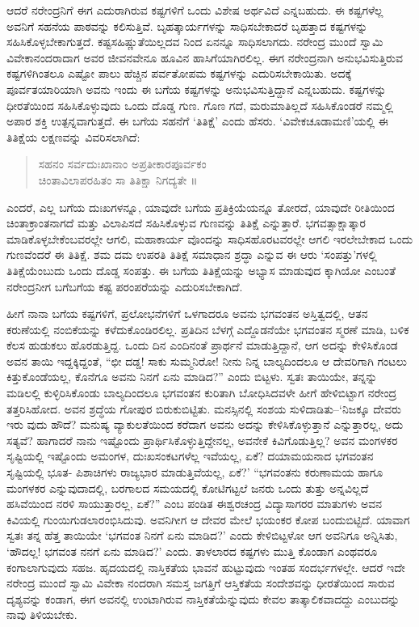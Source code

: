 ಆದರೆ ನರೇಂದ್ರನಿಗೆ ಈಗ ಎದುರಾಗಿರುವ ಕಷ್ಟಗಳಿಗೆ ಒಂದು ವಿಶೇಷ ಅರ್ಥವಿದೆ ಎನ್ನಬಹುದು. ಈ ಕಷ್ಟಗಳೆಲ್ಲ ಅವನಿಗೆ ಸಹನೆಯ ಪಾಠವನ್ನು ಕಲಿಸುತ್ತಿವೆ. ಬೃಹತ್ಕಾರ್ಯಗಳನ್ನು ಸಾಧಿಸಬೇಕಾದರೆ ಬೃಹತ್ತಾದ ಕಷ್ಟಗಳನ್ನು ಸಹಿಸಿಕೊಳ್ಳಬೇಕಾಗುತ್ತದೆ. ಕಷ್ಟಸಹಿಷ್ಣುತೆಯಿಲ್ಲದವ ನಿಂದ ಏನನ್ನೂ ಸಾಧಿಸಲಾಗದು. ನರೇಂದ್ರ ಮುಂದೆ ಸ್ವಾಮಿ ವಿವೇಕಾನಂದರಾದಾಗ ಅವರ ಜೀವನವೇನೂ ಹೂವಿನ ಹಾಸಿಗೆಯಾಗಿರಲಿಲ್ಲ. ಈಗ ನರೇಂದ್ರನಾಗಿ ಅನುಭವಿಸುತ್ತಿರುವ ಕಷ್ಟಗಳಿಗಿಂತಲೂ ಎಷ್ಟೋ ಪಾಲು ಹೆಚ್ಚಿನ ಪರ್ವತೋಪಮ ಕಷ್ಟಗಳನ್ನು ಎದುರಿಸಬೇಕಾಯಿತು. ಅದಕ್ಕೆ ಪೂರ್ವತಯಾರಿಯಾಗಿ ಅವನು ಇಂದು ಈ ಬಗೆಯ ಕಷ್ಟಗಳನ್ನು ಅನುಭವಿಸುತ್ತಿದ್ದಾನೆ ಎನ್ನಬಹುದು. ಕಷ್ಟಗಳನ್ನು ಧೀರತೆಯಿಂದ ಸಹಿಸಿಕೊಳ್ಳುವುದು ಒಂದು ದೊಡ್ಡ ಗುಣ. ಗೊಣ ಗದೆ, ಮರುಮಾತಿಲ್ಲದೆ ಸಹಿಸಿಕೊಂಡರೆ ನಮ್ಮಲ್ಲಿ ಅಪಾರ ಶಕ್ತಿ ಉತ್ಪನ್ನವಾಗುತ್ತದೆ. ಈ ಬಗೆಯ ಸಹನೆಗೆ ‘ತಿತಿಕ್ಷೆ’ ಎಂದು ಹೆಸರು. ‘ವಿವೇಕಚೂಡಾಮಣಿ’ಯಲ್ಲಿ ಈ ತಿತಿಕ್ಷೆಯ ಲಕ್ಷಣವನ್ನು ವಿವರಿಸಲಾಗಿದೆ:

\begin{verse}
ಸಹನಂ ಸರ್ವದುಃಖಾನಾಂ ಅಪ್ರತೀಕಾರಪೂರ್ವಕಂ\\ಚಿಂತಾವಿಲಾಪರಹಿತಂ ಸಾ ತಿತಿಕ್ಷಾ ನಿಗದ್ಯತೇ ॥
\end{verse}

\noindent

ಎಂದರೆ, ಎಲ್ಲ ಬಗೆಯ ದುಃಖಗಳನ್ನೂ, ಯಾವುದೇ ಬಗೆಯ ಪ್ರತಿಕ್ರಿಯೆಯನ್ನೂ ತೋರದೆ, ಯಾವುದೇ ರೀತಿಯಿಂದ ಚಿಂತಾಕ್ರಾಂತನಾಗದೆ ಮತ್ತು ವಿಲಾಪಿಸದೆ ಸಹಿಸಿಕೊಳ್ಳುವ ಗುಣವನ್ನು ತಿತಿಕ್ಷೆ ಎನ್ನುತ್ತಾರೆ. ಭಗವತ್ಸಾಕ್ಷಾತ್ಕಾರ ಮಾಡಿಕೊಳ್ಳಬೇಕೆಂಬವರಲ್ಲೇ ಆಗಲಿ, ಮಹಾಕಾರ್ಯ ವೊಂದನ್ನು ಸಾಧಿಸಹೊರಟವರಲ್ಲೇ ಆಗಲಿ ಇರಲೇಬೇಕಾದ ಒಂದು ಗುಣವೆಂದರೆ ಈ ತಿತಿಕ್ಷೆ. ಶಮ ದಮ ಉಪರತಿ ತಿತಿಕ್ಷೆ ಸಮಾಧಾನ ಶ್ರದ್ಧಾ ಎನ್ನುವ ಈ ಆರು ‘ಸಂಪತ್ತು’ಗಳಲ್ಲಿ ತಿತಿಕ್ಷೆಯೆಂಬುದು ಒಂದು ದೊಡ್ಡ ಸಂಪತ್ತು. ಈ ಬಗೆಯ ತಿತಿಕ್ಷೆಯನ್ನು ಅಭ್ಯಾಸ ಮಾಡುವುದ ಕ್ಕಾಗಿಯೋ ಎಂಬಂತೆ ನರೇಂದ್ರನೀಗ ಬಗೆಬಗೆಯ ಕಷ್ಟ ಪರಂಪರೆಯನ್ನು ಎದುರಿಸಬೇಕಾಗಿದೆ.

ಹೀಗೆ ನಾನಾ ಬಗೆಯ ಕಷ್ಟಗಳಿಗೆ, ಪ್ರಲೋಭನೆಗಳಿಗೆ ಒಳಗಾದರೂ ಅವನು ಭಗವಂತನ ಅಸ್ತಿತ್ವದಲ್ಲಿ, ಆತನ ಕರುಣೆಯಲ್ಲಿ ನಂಬಿಕೆಯನ್ನು ಕಳೆದುಕೊಂಡಿರಲಿಲ್ಲ. ಪ್ರತಿದಿನ ಬೆಳಗ್ಗೆ ಎದ್ದೊಡನೆಯೇ ಭಗವಂತನ ಸ್ಮರಣೆ ಮಾಡಿ, ಬಳಿಕ ಕೆಲಸ ಹುಡುಕಲು ಹೊರಡುತ್ತಿದ್ದ. ಒಂದು ದಿನ ಎಂದಿನಂತೆ ಪ್ರಾರ್ಥನೆ ಮಾಡುತ್ತಿದ್ದಾನೆ, ಆಗ ಅದನ್ನು ಕೇಳಿಸಿಕೊಂಡ ಅವನ ತಾಯಿ ಇದ್ದಕ್ಕಿದ್ದಂತೆ, “ಛೀ ದಡ್ಡ! ಸಾಕು ಸುಮ್ಮನಿರೋ! ನೀನು ನಿನ್ನ ಬಾಲ್ಯದಿಂದಲೂ ಆ ದೇವರಿಗಾಗಿ ಗಂಟಲು ಕಿತ್ತುಕೊಂಡೆಯಲ್ಲ, ಕೊನೆಗೂ ಅವನು ನಿನಗೆ ಏನು ಮಾಡಿದ?” ಎಂದು ಬಿಟ್ಟಳು. ಸ್ವತಃ ತಾಯಿಯೇ, ತನ್ನನ್ನು ಮಡಿಲಲ್ಲಿ ಕುಳ್ಳಿರಿಸಿಕೊಂಡು ಬಾಲ್ಯದಿಂದಲೂ ಭಗವಂತನ ಕುರಿತಾಗಿ ಬೋಧಿಸಿದವಳೇ ಹೀಗೆ ಹೇಳಿಬಿಟ್ಟಾಗ ನರೇಂದ್ರ ತತ್ತರಿಸಿಹೋದ. ಅವನ ಶ್ರದ್ಧೆಯ ಗೋಪುರ ಬಿರುಕುಬಿಟ್ಟಿತು. ಮನಸ್ಸಿನಲ್ಲಿ ಸಂಶಯ ಸುಳಿದಾಡಿತು–‘ನಿಜಕ್ಕೂ ದೇವರು ಇರು ವುದು ಹೌದೆ? ಮನುಷ್ಯ ವ್ಯಾಕುಲತೆಯಿಂದ ಕರೆದಾಗ ಅವನು ಅದನ್ನು ಕೇಳಿಸಿಕೊಳ್ಳುತ್ತಾನೆ ಎನ್ನುತ್ತಾರಲ್ಲ, ಅದು ಸತ್ಯವೆ? ಹಾಗಾದರೆ ನಾನು ಇಷ್ಟೊಂದು ಪ್ರಾರ್ಥಿಸಿಕೊಳ್ಳುತ್ತಿದ್ದೇನಲ್ಲ, ಅವನೇಕೆ ಕಿವಿಗೊಡುತ್ತಿಲ್ಲ? ಅವನ ಮಂಗಳಕರ ಸೃಷ್ಟಿಯಲ್ಲಿ ಇಷ್ಟೊಂದು ಅಮಂಗಳ, ದುಃಖಸಂಕಟಗಳೆಲ್ಲ ಇವೆಯಲ್ಲ, ಏಕೆ? ದಯಾಮಯನಾದ ಭಗವಂತನ ಸೃಷ್ಟಿಯಲ್ಲಿ ಭೂತ- ಪಿಶಾಚಿಗಳು ರಾಜ್ಯಭಾರ ಮಾಡುತ್ತಿವೆಯಲ್ಲ, ಏಕೆ?’ “ಭಗವಂತನು ಕರುಣಾಮಯ ಹಾಗೂ ಮಂಗಳಕರ ಎನ್ನುವುದಾದಲ್ಲಿ, ಬರಗಾಲದ ಸಮಯದಲ್ಲಿ ಕೋಟಿಗಟ್ಟಲೆ ಜನರು ಒಂದು ತುತ್ತು ಅನ್ನವಿಲ್ಲದೆ ಹಸಿವೆಯಿಂದ ನರಳಿ ಸಾಯುತ್ತಾರಲ್ಲ, ಏಕೆ?” ಎಂಬ ಪಂಡಿತ ಈಶ್ವರಚಂದ್ರ ವಿದ್ಯಾಸಾಗರರ ಮಾತುಗಳು ಅವನ ಕಿವಿಯಲ್ಲಿ ಗುಂಯಿಗುಡಲಾರಂಭಿಸಿದುವು. ಅವನಿಗೀಗ ಆ ದೇವರ ಮೇಲೆ ಭಯಂಕರ ಕೋಪ ಬಂದುಬಿಟ್ಟಿದೆ. ಯಾವಾಗ ಸ್ವತಃ ತನ್ನ ಹೆತ್ತ ತಾಯಿಯೇ ‘ಭಗವಂತ ನಿನಗೆ ಏನು ಮಾಡಿದ?’ ಎಂದು ಕೇಳಿಬಿಟ್ಟಳೋ ಆಗ ಅವನಿಗೂ ಅನ್ನಿಸಿತು, ‘ಹೌದಲ್ಲ! ಭಗವಂತ ನನಗೆ ಏನು ಮಾಡಿದ?’ ಎಂದು. ತಾಳಲಾರದ ಕಷ್ಟಗಳು ಮುತ್ತಿ ಕೊಂಡಾಗ ಎಂಥವರೂ ಕಂಗಾಲಾಗುವುದು ಸಹಜ. ಹೃದಯದಲ್ಲಿ ನಾಸ್ತಿಕತೆಯ ಭಾವನೆ ಹುಟ್ಟುವುದು ಇಂತಹ ಸಂದರ್ಭಗಳಲ್ಲೇ. ಆದರೆ ಇದೇ ನರೇಂದ್ರ ಮುಂದೆ ಸ್ವಾಮಿ ವಿವೇಕಾ ನಂದರಾಗಿ ಸಮಸ್ತ ಜಗತ್ತಿಗೆ ಆಸ್ತಿಕತೆಯ ಸಂದೇಶವನ್ನು ಧೀರತೆಯಿಂದ ಸಾರುವ ದೃಶ್ಯವನ್ನು ಕಂಡಾಗ, ಈಗ ಅವನಲ್ಲಿ ಉಂಟಾಗಿರುವ ನಾಸ್ತಿಕತೆಯೆನ್ನುವುದು ಕೇವಲ ತಾತ್ಕಾಲಿಕವಾದದ್ದು ಎಂಬುದನ್ನು ನಾವು ತಿಳಿಯಬೇಕು.


